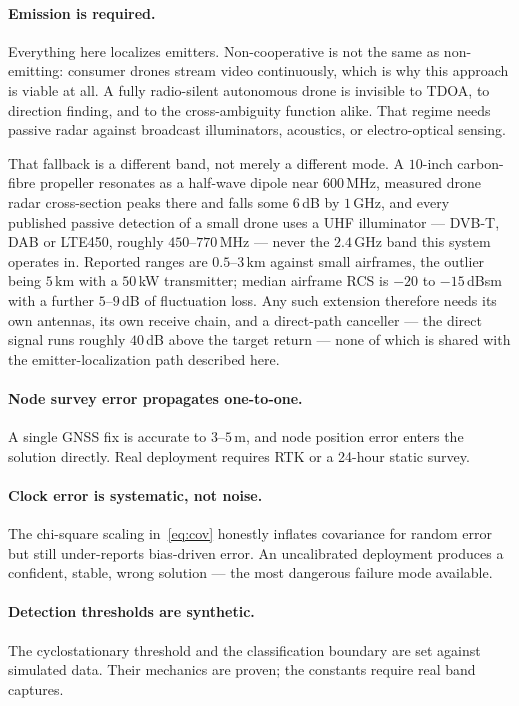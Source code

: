 \documentclass[11pt,a4paper]{article}
\begin{document}
\paragraph{Emission is required.} Everything here localizes emitters.
Non-cooperative is not the same as non-emitting: consumer drones stream
video continuously, which is why this approach is viable at all. A fully
radio-silent autonomous drone is invisible to TDOA, to direction finding,
and to the cross-ambiguity function alike. That regime needs passive radar
against broadcast illuminators, acoustics, or electro-optical sensing.

That fallback is a different band, not merely a different mode. A
$10$-inch carbon-fibre propeller resonates as a half-wave dipole near
$600$\,MHz, measured drone radar cross-section peaks there and falls some
$6$\,dB by $1$\,GHz, and every published passive detection of a small drone
uses a UHF illuminator --- DVB-T, DAB or LTE450, roughly $450$--$770$\,MHz
--- never the $2.4$\,GHz band this system operates in. Reported ranges are
$0.5$--$3$\,km against small airframes, the outlier being $5$\,km with a
$50$\,kW transmitter; median airframe RCS is $-20$ to $-15$\,dBsm with a
further $5$--$9$\,dB of fluctuation loss. Any such extension therefore needs
its own antennas, its own receive chain, and a direct-path canceller ---
the direct signal runs roughly $40$\,dB above the target return --- none of
which is shared with the emitter-localization path described here.

\paragraph{Node survey error propagates one-to-one.} A single GNSS fix is
accurate to $3$--$5$\,m, and node position error enters the solution
directly. Real deployment requires RTK or a 24-hour static survey.

\paragraph{Clock error is systematic, not noise.} The chi-square scaling
in~\eqref{eq:cov} honestly inflates covariance for random error but still
under-reports bias-driven error. An uncalibrated deployment produces a
confident, stable, wrong solution --- the most dangerous failure mode
available.

\paragraph{Detection thresholds are synthetic.} The cyclostationary
threshold and the classification boundary are set against simulated data.
Their mechanics are proven; the constants require real band captures.
\end{document}
